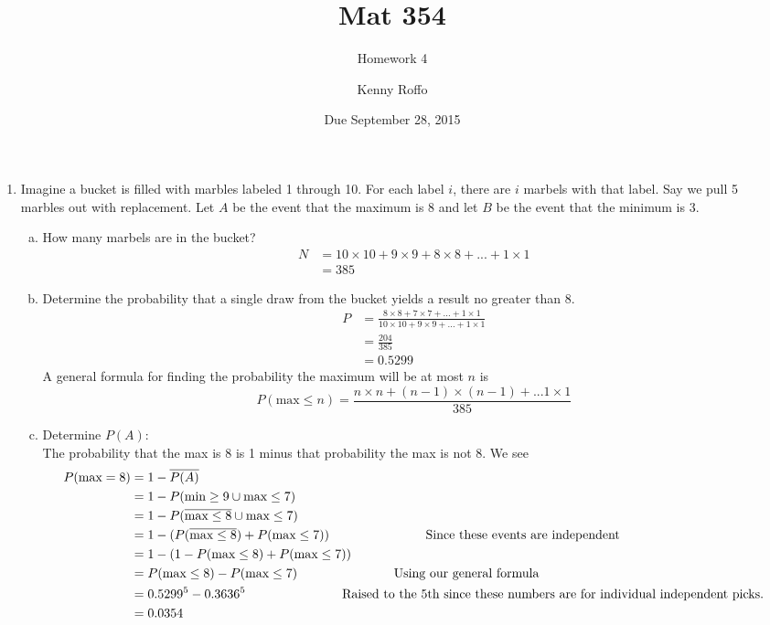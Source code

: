 \documentclass{scrartcl}
\title{Mat 354}
\subtitle{Homework 4}
\author{Kenny Roffo}
\date{Due September 28, 2015}
\begin{document}
\maketitle
\begin{enumerate}
\item Imagine a bucket is filled with marbles labeled 1 through 10. For each label $i$, there are $i$ marbels with that label. Say we pull 5 marbles out with replacement. Let $A$ be the event that the maximum is 8 and let $B$ be the event that the minimum is 3.\\

  \begin{enumerate}[a)]
    \item How many marbels are in the bucket?\\
      \begin{align*}
        N &= 10\times10 + 9\times9 + 8\times8 + ... + 1\times1\\
          &= 385
      \end{align*}
      
    \item Determine the probability that a single draw from the bucket yields a result no greater than 8.\\
      
      \begin{align*}
        P &= \frac{8\times8 + 7\times7 + ... + 1\times1}{10\times10 + 9\times9 + ... + 1\times1}\\
          &= \frac{204}{385}\\
          &= 0.5299
      \end{align*}
      A general formula for finding the probability the maximum will be at most $n$ is $$P(\text{max} \le n) = \frac{n\times n + (n-1)\times(n-1) + ... 1\times1}{385}$$
      \pagebreak
    \item Determine $P(A)$:\\

      The probability that the max is 8 is 1 minus that probability the max is not 8. We see
      \begin{align*}
        P(\text{max}=8) &= 1 - \overline{P(A)}\\
             &= 1 - P(\text{min}\ge9 \cup \text{max}\le7)\\
             &= 1 - P(\overline{\text{max}\le8} \cup \text{max}\le7)\\
             &= 1 - (P(\overline{\text{max}\le8}) + P(\text{max}\le7)) \text{\hspace{1in} Since these events are independent} \\
             &= 1 - (1 - P(\text{max}\le8) + P(\text{max}\le7))\\
             &= P(\text{max}\le8) - P(\text{max}\le7) \text{\hspace{1in} Using our general formula} \\
             &= 0.5299^5 - 0.3636^5 \text{\hspace{1in} Raised to the 5th since these numbers are for individual independent picks.} \\
             &= 0.0354
      \end{align*}


\end{enumerate}
\end{enumerate}
\end{document}
